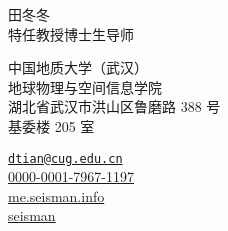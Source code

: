 \documentclass[11pt,a4paper]{article}
\makeatletter
\newcommand{\Name}{田冬冬}
\newcommand{\Role}{特任教授\hspace{0.5em}博士生导师}
\newcommand{\Email}{dtian@cug.edu.cn}
\newcommand{\Website}{me.seisman.info}
\newcommand{\Github}{seisman}
\newcommand{\Orcid}{0000-0001-7967-1197}
\newcommand{\Affiliation}{中国地质大学（武汉）\\ 地球物理与空间信息学院}
\newcommand{\Address}{湖北省武汉市洪山区鲁磨路 388 号\\ 基委楼 205 室}
\makeatother
\begin{document}
\thispagestyle{empty} %
\begin{center}
\kaishu
{\fontsize{24pt}{0}\selectfont \Name \hspace{1ex}} \\[0.4cm]
{\fontsize{16pt}{0}\selectfont \Role} \\[0.2cm]
\end{center}
\begin{minipage}[t]{0.7\textwidth}
  \kaishu
  \fontsize{12pt}{15pt}\selectfont
  \Affiliation
  \\
  \Address
\end{minipage}
\begin{minipage}[t]{0.3\textwidth}
  \kaishu
  \fontsize{12pt}{15pt}\selectfont
  \begin{flushleft}
    \faEnvelope \href{mailto:\Email}{\texttt{\Email}}
	\\
	\faOrcid \href{https://orcid.org/\Orcid}{\Orcid}
	\\
    \faGlobe \href{https://\Website}{\Website}
	\\
	\faGithub \href{https://github.com/\Github}{\Github}
  \end{flushleft}
\end{minipage}
\vspace{0.2cm}














\end{document}
